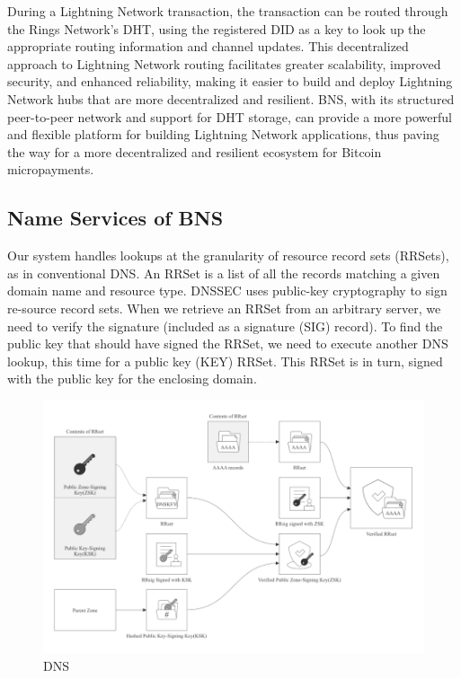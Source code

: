 \documentclass[twocolumn]{article}
\begin{document}
During a Lightning Network transaction, the transaction can be routed through the Rings Network's DHT, using the registered DID as a key to look up the appropriate routing information and channel updates. This decentralized approach to Lightning Network routing facilitates greater scalability, improved security, and enhanced reliability, making it easier to build and deploy Lightning Network hubs that are more decentralized and resilient. BNS, with its structured peer-to-peer network and support for DHT storage, can provide a more powerful and flexible platform for building Lightning Network applications, thus paving the way for a more decentralized and resilient ecosystem for Bitcoin micropayments.
\subsection{Name Services of BNS}
Our system handles lookups at the granularity of resource record sets (RRSets), as in conventional DNS. An RRSet is a list of all the records matching a given domain name and resource type.
DNSSEC uses public-key cryptography to sign re-source record sets. When we retrieve an RRSet from an arbitrary server, we need to verify the signature (included as a signature (SIG) record). To find the public key that should have signed the RRSet, we need to execute another DNS lookup, this time for a public key (KEY) RRSet. This RRSet is in turn, signed with the public key for the enclosing domain.
\begin{figure}[H]
  \includegraphics[width=\linewidth]{imgs/2.png}
    \caption{DNS}
\end{figure}
\end{document}
